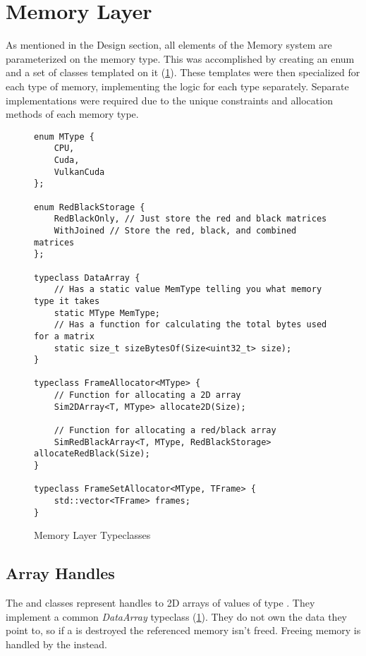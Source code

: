 \section{Memory Layer}
As mentioned in the Design section, all elements of the Memory system are parameterized on the memory type.
This was accomplished by creating an enum  and a set of classes templated on it (\cref{fig:TypeclassMemory}).
These templates were then specialized for each type of memory, implementing the logic for each type separately.
Separate implementations were required due to the unique constraints and allocation methods of each memory type.

\begin{figure}
    \centering
\begin{verbatim}
enum MType {
    CPU,
    Cuda,
    VulkanCuda
};

enum RedBlackStorage {
    RedBlackOnly, // Just store the red and black matrices
    WithJoined // Store the red, black, and combined matrices
};

typeclass DataArray {
    // Has a static value MemType telling you what memory type it takes
    static MType MemType;
    // Has a function for calculating the total bytes used for a matrix
    static size_t sizeBytesOf(Size<uint32_t> size);
}

typeclass FrameAllocator<MType> {
    // Function for allocating a 2D array
    Sim2DArray<T, MType> allocate2D(Size);
    
    // Function for allocating a red/black array
    SimRedBlackArray<T, MType, RedBlackStorage> allocateRedBlack(Size);
}

typeclass FrameSetAllocator<MType, TFrame> {
    std::vector<TFrame> frames;
}
\end{verbatim}
    \caption{Memory Layer Typeclasses}
    \label{fig:TypeclassMemory}
\end{figure}

\subsection{Array Handles}
The  and  classes represent handles to 2D arrays of values of type .
They implement a common \emph{DataArray} typeclass (\cref{fig:TypeclassMemory}).
They do not own the data they point to, so if a  is destroyed the referenced memory isn't freed.
Freeing memory is handled by the  instead.

